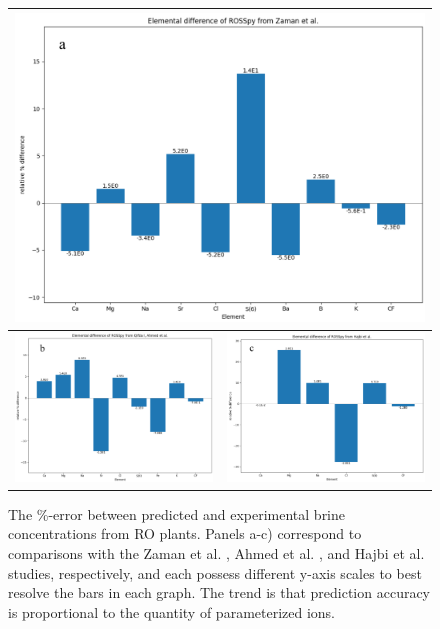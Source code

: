 \begin{figure}[t]
    \centering
    \begin{tabular}{c|c}
        \multicolumn{2}{c}{\includegraphics[width=\linewidth]{images/ROSSpy/case_studies/Zaman_comparison.png}} \\ \midrule
        \includegraphics[width=0.49\linewidth]{images/ROSSpy/case_studies/Ahmed_comparison.png} & 
        \includegraphics[width=0.49\linewidth]{images/ROSSpy/case_studies/Hajbi_comparison.png} \\ \bottomrule
    \end{tabular}
    \caption{
        The \%-error between predicted and experimental brine concentrations from RO plants. Panels a-c) correspond to comparisons with the Zaman et al. \cite{Zaman2015DownstreamCompounds}, Ahmed et al. \cite{Ahmed2001BrineEmirates}, and Hajbi et al. \cite{Hajbi2010ReuseBrine} studies, respectively, and each possess different y-axis scales to best resolve the bars in each graph. The trend is that prediction accuracy is proportional to the quantity of parameterized ions. 
    }
    \label{bar_graphs}
\end{figure}


